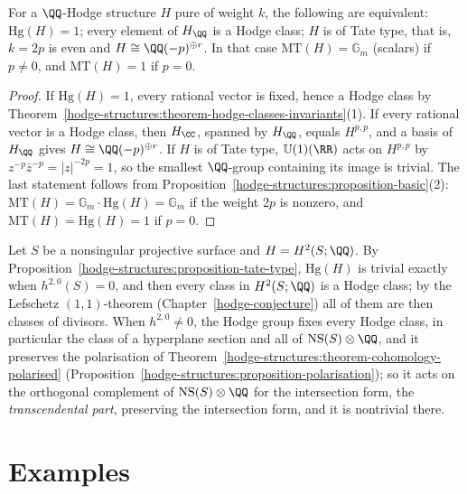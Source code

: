 \begin{proposition}\label{hodge-structures:proposition-tate-type}
For a $\QQ$-Hodge structure $H$ pure of weight $k$, the following are equivalent: $\mathrm{Hg}(H) = 1$; every element of $H_\QQ$ is a Hodge class; $H$ is of Tate type, that is, $k = 2p$ is even and
$H \cong \QQ(-p)^{\oplus r}$. In that case $\mathrm{MT}(H) = \mathbb{G}_m$ (scalars) if $p \neq 0$, and $\mathrm{MT}(H) = 1$ if $p = 0$.
\end{proposition}

\begin{proof}
If $\mathrm{Hg}(H) = 1$, every rational vector is fixed, hence a Hodge class by Theorem~\ref{hodge-structures:theorem-hodge-classes-invariants}(1). If every rational vector is a Hodge class, then $H_\CC$,
spanned by $H_\QQ$, equals $H^{p,p}$, and a basis of $H_\QQ$ gives $H \cong \QQ(-p)^{\oplus r}$. If $H$ is of Tate type, $\mathbb{U}(1)(\RR)$ acts on $H^{p,p}$ by $z^{-p}\bar z^{-p} = |z|^{-2p} = 1$, so the smallest
$\QQ$-group containing its image is trivial. The last statement follows from Proposition~\ref{hodge-structures:proposition-basic}(2): $\mathrm{MT}(H) = \mathbb{G}_m \cdot \mathrm{Hg}(H) = \mathbb{G}_m$ if the weight
$2p$ is nonzero, and $\mathrm{MT}(H) = \mathrm{Hg}(H) = 1$ if $p = 0$.
\end{proof}

\begin{example}\label{hodge-structures:example-weight-two}
Let $S$ be a nonsingular projective surface and $H = H^2(S; \QQ)$. By Proposition~\ref{hodge-structures:proposition-tate-type}, $\mathrm{Hg}(H)$ is trivial exactly when $h^{2,0}(S) = 0$, and then every class in
$H^2(S; \QQ)$ is a Hodge class; by the Lefschetz $(1,1)$-theorem (Chapter~\ref{hodge-conjecture}) all of them are then classes of divisors. When $h^{2,0} \neq 0$, the Hodge group fixes every Hodge class, in particular the class of a hyperplane section and all of
$\mathrm{NS}(S) \otimes \QQ$, and it preserves the polarisation of Theorem~\ref{hodge-structures:theorem-cohomology-polarised} (Proposition~\ref{hodge-structures:proposition-polarisation}); so it acts on the orthogonal
complement of $\mathrm{NS}(S) \otimes \QQ$ for the intersection form, the \emph{transcendental part}, preserving the intersection form, and it is nontrivial there.
\end{example}

\section{Examples}\label{hodge-structures:section-examples}

